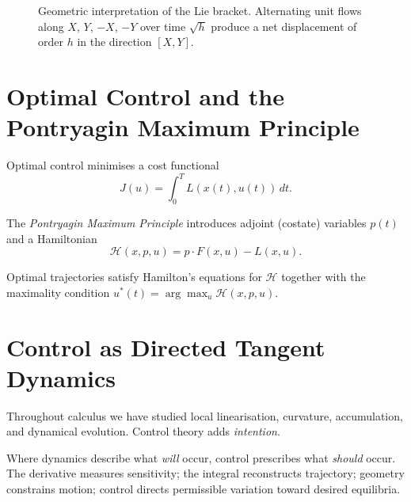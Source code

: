 \documentclass[12pt,openany]{book}
\begin{document}
\begin{figure}[H]
\centering
{}
\caption{Geometric interpretation of the Lie bracket. Alternating unit flows
along $X$, $Y$, $-X$, $-Y$ over time $\sqrt{h}$ produce a net displacement of
order $h$ in the direction $[X,Y]$.}
\label{fig:liebracket}
\end{figure}

\section{Optimal Control and the Pontryagin Maximum Principle}

Optimal control minimises a cost functional
\[
  J(u) = \int_0^T L(x(t),u(t))\,dt.
\]

The \emph{Pontryagin Maximum Principle} introduces adjoint (costate) variables
$p(t)$ and a Hamiltonian
\[
  \mathcal{H}(x,p,u) = p\cdot F(x,u) - L(x,u).
\]

Optimal trajectories satisfy Hamilton's equations for $\mathcal{H}$ together
with the maximality condition $u^*(t) = \arg\max_u \mathcal{H}(x,p,u)$.

\section{Control as Directed Tangent Dynamics}

Throughout calculus we have studied local linearisation, curvature,
accumulation, and dynamical evolution. Control theory adds \emph{intention}.

Where dynamics describe what \emph{will} occur, control prescribes what
\emph{should} occur. The derivative measures sensitivity; the integral
reconstructs trajectory; geometry constrains motion; control directs
permissible variation toward desired equilibria.
\end{document}
